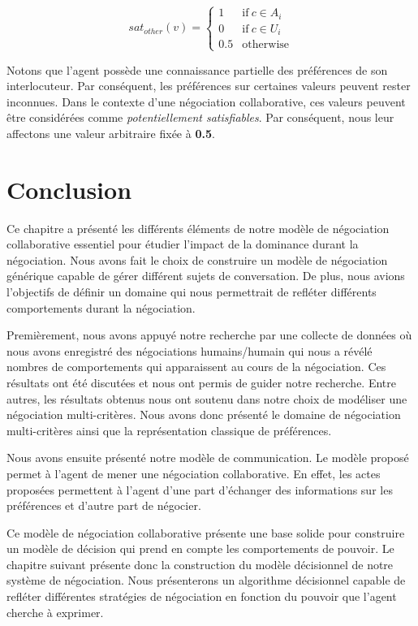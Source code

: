 					\begin{equation}
					sat_{other}(v)= \left\{\begin{array}{ll}
					1	 & \mathrm{if\ }  c \in A_i\\
					0    & \mathrm{if\ }c \in U_i\\
					0.5	 & \mathrm{otherwise}
					\end{array}\right.
					\end{equation}
					
				Notons que l'agent possède une connaissance partielle des préférences de son interlocuteur. Par conséquent, les préférences sur certaines valeurs peuvent rester inconnues. Dans  le contexte d'une négociation collaborative, ces valeurs peuvent être considérées comme \textit{potentiellement satisfiables}. Par conséquent, nous leur affectons une valeur arbitraire fixée à \textbf{0.5}.
				
	\section{Conclusion}
			Ce chapitre a présenté les différents éléments de notre modèle de négociation collaborative essentiel pour étudier l'impact de la dominance durant la négociation. Nous avons fait le choix de construire un modèle de négociation générique capable de gérer différent sujets de conversation. De plus, nous avions l'objectifs de définir un domaine qui nous permettrait de refléter différents comportements durant la négociation. 
			
			Premièrement, nous avons appuyé notre recherche par une collecte de données où nous avons enregistré des négociations humains/humain qui nous a révélé nombres de comportements qui apparaissent au cours de la négociation. Ces résultats ont été discutées et nous ont permis de guider notre recherche. Entre autres, les résultats obtenus nous ont soutenu dans notre choix de modéliser une négociation  multi-critères.
			Nous avons donc présenté le domaine de négociation multi-critères ainsi que la représentation classique de préférences.
			
			Nous avons ensuite présenté notre modèle de communication. Le modèle proposé permet à l'agent de mener une négociation collaborative. En effet, les actes proposées permettent à l'agent d'une part d'échanger des informations sur les préférences et d'autre part de négocier. 
			
			Ce modèle de négociation collaborative présente une base solide pour construire un modèle de décision qui prend en compte les comportements de pouvoir. Le chapitre suivant présente donc la construction du modèle décisionnel de notre système de négociation. Nous présenterons un algorithme décisionnel capable de refléter différentes stratégies de négociation en fonction du pouvoir que l'agent cherche à exprimer.
					
